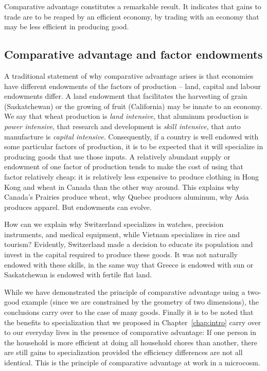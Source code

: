 Comparative advantage constitutes a remarkable result. It indicates that gains to trade are to be reaped by an efficient economy, by trading with an economy that may be less efficient in producing  good. 

\subsection*{Comparative advantage and factor endowments}

A traditional statement of why comparative advantage arises is that economies have different endowments of the factors of production -- land, capital and labour endowments differ. A land endowment that facilitates the harvesting of grain (Saskatchewan) or the growing of fruit (California) may be innate to an economy. We say that wheat production is \textit{land intensive}, that aluminum production is \textit{power intensive}, that research and development is \textit{skill intensive}, that auto manufacture is \textit{capital intensive}. Consequently, if a country is well endowed with some particular factors of production, it is to be expected that it will specialize in producing goods that use those inputs. A relatively abundant supply or endowment of one factor of production tends to make the cost of using that factor relatively cheap: it is relatively less expensive to produce clothing in Hong Kong and wheat in Canada than the other way around. This explains why Canada's Prairies produce wheat, why Quebec produces aluminum, why Asia produces apparel. But endowments can evolve. 

How can we explain why Switzerland specializes in watches, precision instruments, and medical equipment, while Vietnam specializes in rice and tourism? Evidently, Switzerland made a decision to educate its population and invest in the capital required to produce these goods. It was not naturally endowed with these skills, in the same way that Greece is endowed with sun or Saskatchewan is endowed with fertile flat land. 

While we have demonstrated the principle of comparative advantage using a two-good example (since we are constrained by the geometry of two dimensions), the conclusions carry over to the case of many goods. Finally it is to be noted that the benefits to specialization that we proposed in Chapter~\ref{chap:intro} carry over to our everyday lives in the presence of comparative advantage: If one person in the household is more efficient at doing all household chores than another, there are still gains to specialization provided the efficiency differences are not all identical. This is the principle of comparative advantage at work in a microcosm.

